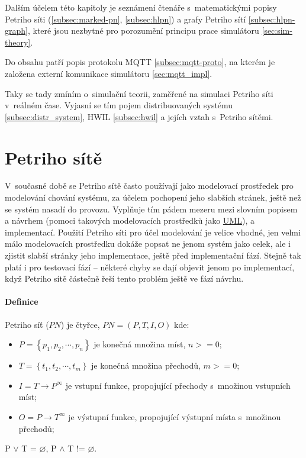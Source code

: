 Dalším účelem této kapitoly je seznámení čtenáře s~matematickými popisy Petriho síti (\ref{subsec:marked-pn}, \ref{subsec:hlpn}) a grafy Petriho sítí \ref{subsec:hlpn-graph}, které jsou nezbytné pro porozumění principu prace simulátoru \ref{sec:sim-theory}.

Do obsahu patří popis protokolu MQTT \ref{subsec:mqtt-proto}, na kterém je založena externí komunikace simulátoru \ref{sec:mqtt_impl}.

Taky se tady zmíním o~simulační teorii, zaměřené na simulaci Petriho síti v~reálném čase. Vyjasní se tím pojem distribuovaných systému \ref{subsec:distr_system}, HWIL \ref{subsec:hwil} a jejích vztah s~Petriho sítěmi.

\section{Petriho sítě}

V~současné době se Petriho sítě často používají jako modelovací prostředek pro modelování chování systému, za účelem pochopení jeho slabších stránek, ještě než se systém nasadí do provozu. Vyplňuje tím pádem mezeru mezi slovním popisem a návrhem (pomoci takových modelovacích prostředků jako \href{https://en.wikipedia.org/wiki/Unified_Modeling_Language}{UML}), a implementací. Použití Petriho síti pro účel modelování je velice vhodné, jen velmi málo modelovacích prostředku dokáže popsat ne jenom systém jako celek, ale i zjistit slabší stránky jeho implementace, ještě před implementační fází. Stejně tak platí i pro testovací fází -- některé chyby se dají objevit jenom po implementací, když Petriho sítě částečně řeší tento problém ještě ve fází návrhu.

\paragraph{Definice}

Petriho síť ($PN$) je čtyřce, $PN = \left(P, T, I, O\right)$ kde:
  \begin{itemize}
    \item $P = \left\{p_1, p_2, \cdots , p_n\right\}$ je konečná množina míst, $n >= 0$; \\
    \item $T = \left\{t_1, t_2, \cdots , t_m\right\}$ je konečná množina přechodů, $m >= 0$; \\
    \item $I = T \rightarrow P^\infty$ je vstupní funkce, propojující přechody s~množinou vstupních míst; \\
    \item $O = P \rightarrow T^\infty$ je výstupní funkce, propojující výstupní místa s~množinou přechodů; \\
  \end{itemize}
P $\vee$ T = $\varnothing$, P $\wedge$ T != $\varnothing$.

